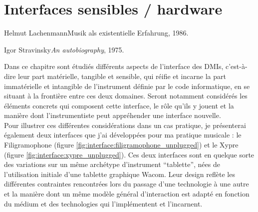 %
\chapter{Interfaces sensibles / hardware}
\label{ch:interfaces}

{Helmut Lachenmann}{Musik als existentielle Erfahrung, 1986.\\\cite{lachenmann_musik_1996}}


{Igor Stravinsky}{\textit{An autobiography}, 1975.\\\cite{stravinsky_autobiography_1975}}

\vspace*{\fill}

\noindent Dans ce chapitre sont étudiés différents aspects de l'interface des \glspl{DMI}, c'est-à-dire leur part matérielle, tangible et sensible, qui réifie et incarne la part immatérielle et intangible de l'instrument définie par le code informatique, en se situant à la frontière entre ces deux domaines. Seront notamment considérés les éléments concrets qui composent cette interface, le rôle qu'ils y jouent et la manière dont l'instrumentiste peut appréhender une interface nouvelle.\\
\indent Pour illustrer ces différentes considérations dans un cas pratique, je présenterai également deux interfaces que j'ai développées pour ma pratique musicale : le Filigramophone (figure \ref{fig:interface:filigramophone_unplugged}) et le Xypre (figure \ref{fig:interface:xypre_unplugged}). Ces deux interfaces sont en quelque sorte des variations sur un même archétype d'instrument ``tablette'', nées de l'utilisation initiale d'une tablette graphique Wacom. Leur design reflète les différentes contraintes rencontrées lors du passage d'une technologie à une autre et la manière dont un même modèle général d'interaction est adapté en fonction du médium et des technologies qui l'implémentent et l'incarnent.

